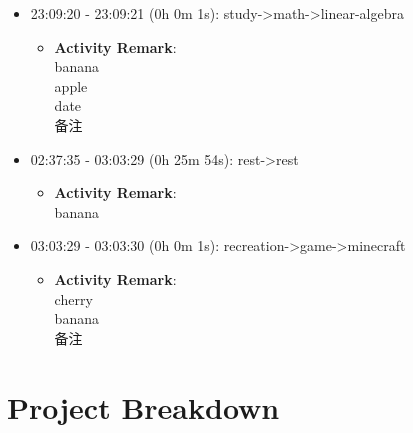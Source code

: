 \documentclass[12pt]{extarticle}
\begin{document}
\begin{itemize}[topsep=0pt, itemsep=-0.5ex]
    \item \textcolor{studycolor}{23:09:20 - 23:09:21 (0h 0m 1s): study->math->linear-algebra}
    \begin{itemize}[topsep=0pt, itemsep=-0.5ex]
        \item \textbf{Activity Remark}:\\
        banana\\
apple\\
date\\
备注
    \end{itemize}
    \item 02:37:35 - 03:03:29 (0h 25m 54s): rest->rest
    \begin{itemize}[topsep=0pt, itemsep=-0.5ex]
        \item \textbf{Activity Remark}:\\
        banana
    \end{itemize}
    \item \textcolor{recreationcolor}{03:03:29 - 03:03:30 (0h 0m 1s): recreation->game->minecraft}
    \begin{itemize}[topsep=0pt, itemsep=-0.5ex]
        \item \textbf{Activity Remark}:\\
        cherry\\
banana\\
备注
    \end{itemize}
\end{itemize}

{\fontsize{16}{19.2}\selectfont\section*{Project Breakdown}}
\end{document}
